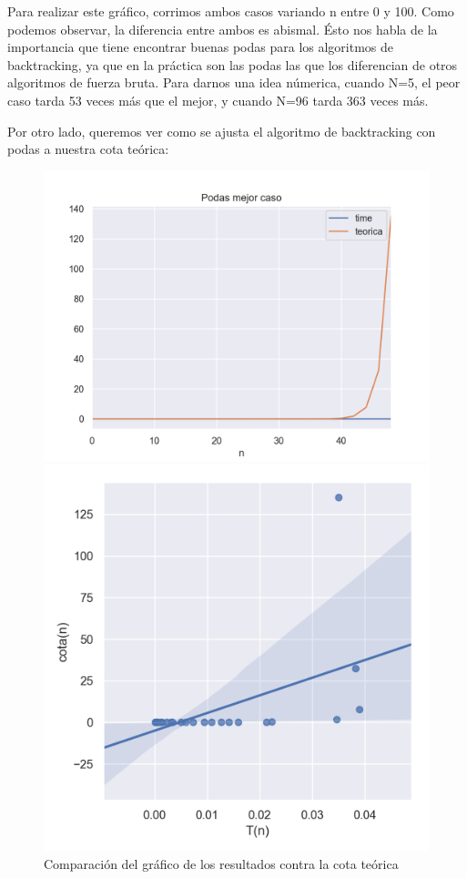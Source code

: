 Para realizar este gráfico, corrimos ambos casos variando n entre 0 y 100. Como podemos observar, la diferencia entre ambos es abismal. Ésto nos habla de la importancia que tiene encontrar buenas podas para los algoritmos de backtracking, ya que en la práctica son las podas las que los diferencian de otros algoritmos de fuerza bruta. Para darnos una idea númerica, cuando N=5, el peor caso tarda 53 veces más que el mejor, y cuando N=96 tarda 363 veces más.

Por otro lado, queremos ver como se ajusta el algoritmo de backtracking con podas a nuestra cota teórica:

\begin{figure}[!htb]
   \begin{minipage}{0.5\textwidth}
     \centering
     \includegraphics[width=1\linewidth]{img/mejor_Figure_1}
     \caption{Comparación del gráfico de los resultados contra la cota teórica}
   \end{minipage}\hfill
   \begin{minipage}{0.5\textwidth}
     \centering
     \includegraphics[width=1\linewidth]{img/mejor_Figure_2}

\end{minipage}
\end{figure}
